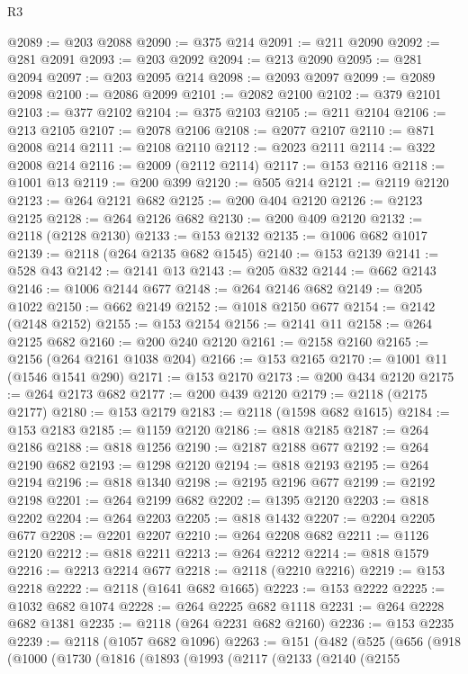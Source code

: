 \begin{lexlean}{R3}
\begin{coremodule}
@2089 := @203 @2088
@2090 := @375 @214
@2091 := @211 @2090
@2092 := @281 @2091
@2093 := @203 @2092
@2094 := @213 @2090
@2095 := @281 @2094
@2097 := @203 @2095 @214
@2098 := @2093 @2097
@2099 := @2089 @2098
@2100 := @2086 @2099
@2101 := @2082 @2100
@2102 := @379 @2101
@2103 := @377 @2102
@2104 := @375 @2103
@2105 := @211 @2104
@2106 := @213 @2105
@2107 := @2078 @2106
@2108 := @2077 @2107
@2110 := @871 @2008 @214
@2111 := @2108 @2110
@2112 := @2023 @2111
@2114 := @322 @2008 @214
@2116 := @2009 (@2112 @2114)
@2117 := @153 @2116
@2118 := @1001 @13
@2119 := @200 @399
@2120 := @505 @214
@2121 := @2119 @2120
@2123 := @264 @2121 @682
@2125 := @200 @404 @2120
@2126 := @2123 @2125
@2128 := @264 @2126 @682
@2130 := @200 @409 @2120
@2132 := @2118 (@2128 @2130)
@2133 := @153 @2132
@2135 := @1006 @682 @1017
@2139 := @2118 (@264 @2135 @682 @1545)
@2140 := @153 @2139
@2141 := @528 @43
@2142 := @2141 @13
@2143 := @205 @832
@2144 := @662 @2143
@2146 := @1006 @2144 @677
@2148 := @264 @2146 @682
@2149 := @205 @1022
@2150 := @662 @2149
@2152 := @1018 @2150 @677
@2154 := @2142 (@2148 @2152)
@2155 := @153 @2154
@2156 := @2141 @11
@2158 := @264 @2125 @682
@2160 := @200 @240 @2120
@2161 := @2158 @2160
@2165 := @2156 (@264 @2161 @1038 @204)
@2166 := @153 @2165
@2170 := @1001 @11 (@1546 @1541 @290)
@2171 := @153 @2170
@2173 := @200 @434 @2120
@2175 := @264 @2173 @682
@2177 := @200 @439 @2120
@2179 := @2118 (@2175 @2177)
@2180 := @153 @2179
@2183 := @2118 (@1598 @682 @1615)
@2184 := @153 @2183
@2185 := @1159 @2120
@2186 := @818 @2185
@2187 := @264 @2186
@2188 := @818 @1256
@2190 := @2187 @2188 @677
@2192 := @264 @2190 @682
@2193 := @1298 @2120
@2194 := @818 @2193
@2195 := @264 @2194
@2196 := @818 @1340
@2198 := @2195 @2196 @677
@2199 := @2192 @2198
@2201 := @264 @2199 @682
@2202 := @1395 @2120
@2203 := @818 @2202
@2204 := @264 @2203
@2205 := @818 @1432
@2207 := @2204 @2205 @677
@2208 := @2201 @2207
@2210 := @264 @2208 @682
@2211 := @1126 @2120
@2212 := @818 @2211
@2213 := @264 @2212
@2214 := @818 @1579
@2216 := @2213 @2214 @677
@2218 := @2118 (@2210 @2216)
@2219 := @153 @2218
@2222 := @2118 (@1641 @682 @1665)
@2223 := @153 @2222
@2225 := @1032 @682 @1074
@2228 := @264 @2225 @682 @1118
@2231 := @264 @2228 @682 @1381
@2235 := @2118 (@264 @2231 @682 @2160)
@2236 := @153 @2235
@2239 := @2118 (@1057 @682 @1096)
@2263 := @151
    (@482
      (@525
        (@656
          (@918
            (@1000
              (@1730
                (@1816
                  (@1893
                    (@1993
                      (@2117
                        (@2133
                          (@2140
                            (@2155

\end{coremodule}
\end{lexlean}
